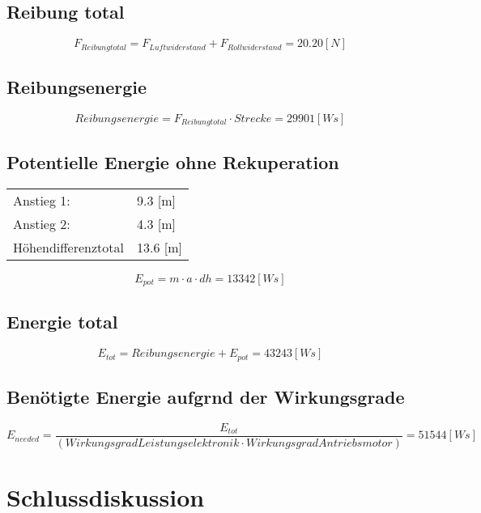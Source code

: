 \documentclass[a4,paper,fleqn]{article}
\begin{document}
\subsection{Reibung total}
\[ F_{Reibungtotal} = F_{Luftwiderstand} + F_{Rollwiderstand} = 20.20 [N]\]

\subsection{Reibungsenergie}
\[ Reibungsenergie = F_{Reibungtotal}  \cdot  Strecke = 29901 [Ws]\]

\subsection{Potentielle Energie ohne Rekuperation}
\begin{tabular}{ll}
Anstieg 1: & 9.3 [m]\\
Anstieg 2: & 4.3 [m]\\
Höhendifferenztotal & 13.6 [m]\\
\end{tabular}
\[ E_{pot} = m \cdot a \cdot dh = 13342 [Ws]\]

\subsection{Energie total}
\[ E_{tot} = Reibungsenergie + E_{pot} = 43243 [Ws]\]

\subsection{Benötigte Energie aufgrnd der Wirkungsgrade}
\[ E_{needed} = \frac{E_{tot}}{(Wirkungsgrad Leistungselektronik \cdot Wirkungsgrad Antriebsmotor)} = 51544 [Ws] \]

\section{Schlussdiskussion}

\begin{appendix}

\end{appendix}
\end{document}
